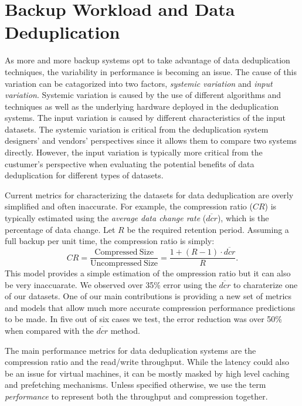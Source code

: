 \chapter{Backup Workload and Data Deduplication}
\label{BW}

As more and more backup systems opt to take advantage of data deduplication techniques, the variability in performance is becoming an issue. 
The cause of this variation can be catagorized into two factors, \emph{systemic variation} and \emph{input variation}. Systemic variation is caused by the use of different algorithms and techniques as well as the underlying hardware deployed in the deduplication systems. The input variation is caused by different characteristics of the input datasets. The systemic variation is critical from the deduplication system designers' and vendors' perspectives since it allows them to compare two systems directly. However, the input variation is typically more critical from the custumer's perspective when evaluating the potential benefits of data deduplication for different types of datasets.  

Current metrics for characterizing the datasets for data deduplication are overly simplified and often inaccurate. For example, the compression ratio ($\mathit{CR}$) is typically estimated using the \emph{average data change rate} ($\overline{\mathit{dcr}}$), which is the percentage of data change. Let $R$ be the required retention period. Assuming a full backup per unit time, the compression ratio is simply: 
\begin{equation}\label{dcr_est}
\mathit{CR}= \frac{\mathrm{Compressed\ Size}}{\mathrm{Uncompressed\ Size}}=\frac{1+(R-1)\cdot \overline{\mathit{dcr}}}{R}. 
\end{equation}
This model provides a simple estimation of the ompression ratio but it can also be very inaccuarate. We observed over 35\% error using the $\overline{\mathit{dcr}}$ to charaterize one of our datasets. One of our main contributions is providing a new set of metrics and models that allow much more accurate compression performance predictions to be made. In five out of six cases we test, the error reduction was over 50\% when compared with the $\overline{\mathit{dcr}}$ method.  

The main performance metrics for data deduplication systems are the compression ratio and the read/write throughput. While the latency could also be an issue for virtual machines, it can be mostly masked by high level caching and prefetching mechanisms. Unless specified otherwise, we use the term \emph{performance} to represent both the throughput and compression together. 

